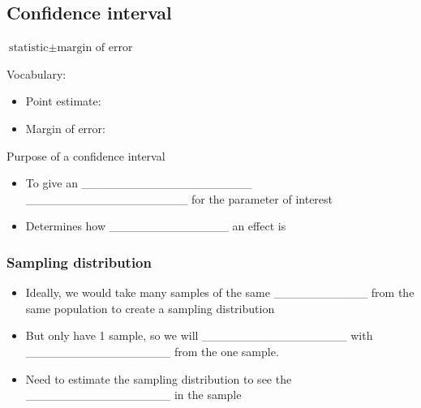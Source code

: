 \documentclass[
]{report}
\providecommand{\tightlist}{%
  \setlength{\itemsep}{0pt}\setlength{\parskip}{0pt}}
\newcommand{\rgi}{\hspace{24pt}}  %
\begin{document}
\vspace{0.4in}

\hypertarget{confidence-interval}{%
\subsection*{Confidence interval}\label{confidence-interval}}

\rgi \(\text{statistic} \pm \text{margin of error}\)

Vocabulary:

\begin{itemize}
\tightlist
\item
  Point estimate:
\end{itemize}

\vspace{0.3in}

\begin{itemize}
\tightlist
\item
  Margin of error:
\end{itemize}

\vspace{0.3in}


Purpose of a confidence interval

\begin{itemize}
\item
  To give an \_\_\_\_\_\_\_\_\_\_\_\_\_\_\_\_\_\_\_\_ \_\_\_\_\_\_\_\_\_\_\_\_\_\_\_\_\_\_\_ for the parameter of interest
\item
  Determines how \_\_\_\_\_\_\_\_\_\_\_\_\_\_ an effect is
\end{itemize}


\hypertarget{sampling-distribution}{%
\subsubsection*{Sampling distribution}\label{sampling-distribution}}


\begin{itemize}
\item
  Ideally, we would take many samples of the same \_\_\_\_\_\_\_\_\_\_\_ from the same population to create a sampling distribution
\item
  But only have 1 sample, so we will \_\_\_\_\_\_\_\_\_\_\_\_\_\_\_\_\_ with \_\_\_\_\_\_\_\_\_\_\_\_\_\_\_\_\_ from the one sample.
\item
  Need to estimate the sampling distribution to see the \_\_\_\_\_\_\_\_\_\_\_\_\_\_\_\_\_ in the sample
\end{itemize}
\end{document}
